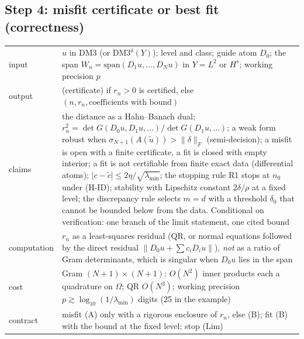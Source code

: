 \subsection*{Step 4: misfit certificate or best fit (correctness)}
\begin{tabular}{@{}p{2.2cm}p{9.6cm}@{}}
\toprule
input & $u$ in DM3 (or DM3$^\delta(Y)$); level and class; guide atom $D_0$; the span $W_n=\mathrm{span}(D_1u,\dots,D_Nu)$ in $Y=L^2$ or $H^s$; working precision $p$\\
output & \MIS{}(certificate) if $r_n>0$ is certified, else \FC{}$(n,r_n,\text{coefficients with bound})$\\
claims & the distance as a Hahn--Banach dual; $r_n^2=\det G(D_0u,D_1u,\dots)/\det G(D_1u,\dots)$; a weak form robust when $\sigma_{N+1}(A(\tilde u))>\lVert\delta\rVert_F$ (semi-decision); a misfit is open with a finite certificate, a fit is closed with empty interior; a fit is not certifiable from finite exact data (differential atoms); $\lvert c-\tilde c\rvert\le2\eta/\sqrt{\lambda_{\min}}$; the stopping rule R1 stops at $n_0$ under (H-ID); stability with Lipschitz constant $2\delta/\rho$ at a fixed level; the discrepancy rule selects $m=d$ with a threshold $\delta_0$ that cannot be bounded below from the data. Conditional on verification: one branch of the limit statement, one cited bound\\
computation & $r_n$ as a least-squares residual (QR, or normal equations followed by the direct residual $\lVert D_0u+\sum c_iD_iu\rVert$), \emph{not} as a ratio of Gram determinants, which is singular when $D_0u$ lies in the span\\
cost & Gram $(N+1)\times(N+1)$: $O(N^2)$ inner products each a quadrature on $\Omega$; QR $O(N^3)$; working precision $p\gtrsim\log_{10}(1/\lambda_{\min})$ digits (25 in the example)\\
contract & misfit (A) only with a rigorous enclosure of $r_n$, else (B); fit (B) with the bound at the fixed level; stop (Lim)\\
\bottomrule
\end{tabular}

